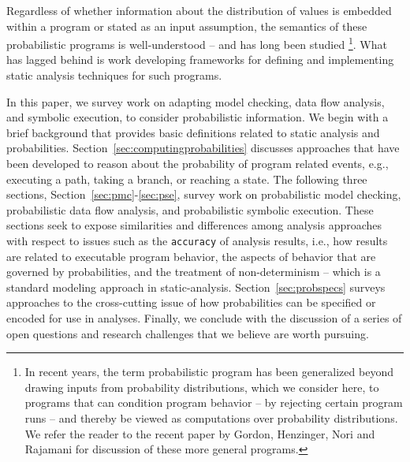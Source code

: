 Regardless of whether information about the distribution of
values is embedded within a program or stated as an input assumption,
the semantics of these probabilistic programs is well-understood --
and has long been studied \cite{Kozen,others}
\footnote{In recent
years, the term probabilistic program has been generalized beyond
drawing inputs from probability distributions, which we
consider here, to programs that can condition program behavior -- by
rejecting certain program runs -- and thereby be viewed as
computations over probability distributions.  We refer the reader to the
recent paper by Gordon, Henzinger, Nori and Rajamani \cite{ICSE2014}
for discussion of these more general programs.}. 
What has lagged behind is work developing frameworks for 
defining and implementing static analysis techniques for such programs.

In this paper, we survey work on adapting model checking, data flow analysis, 
and symbolic execution, to consider probabilistic information.
We begin with a brief background that provides basic definitions
related to static analysis and probabilities.
Section~\ref{sec:computingprobabilities} discusses approaches that
have been developed to reason about the probability of program
related events, e.g., executing a path, taking a branch, or reaching a state.
The following three sections, 
Section~\ref{sec:pmc}-\ref{sec:pse}, survey work on probabilistic
model checking, probabilistic data flow analysis, and probabilistic
symbolic execution.  These sections seek to expose similarities
and differences among analysis approaches with respect to issues
such as the \texttt{accuracy} of analysis results, i.e., how results
are related to executable program behavior, 
the aspects of behavior that are governed by probabilities, and
the treatment of non-determinism -- which is a standard modeling
approach in static-analysis.
Section~\ref{sec:probspecs} surveys approaches to the cross-cutting
issue of how probabilities can be specified or encoded for use
in analyses.
Finally, we conclude with the discussion of a series of open questions
and research challenges that we believe are worth pursuing.

